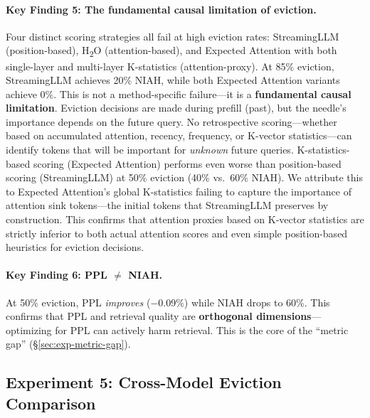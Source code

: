 \paragraph{Key Finding 5: The fundamental causal limitation of eviction.}
Four distinct scoring strategies all fail at high eviction rates: StreamingLLM (position-based), H\textsubscript{2}O (attention-based), and Expected Attention with both single-layer and multi-layer K-statistics (attention-proxy). At 85\% eviction, StreamingLLM achieves 20\% NIAH, while both Expected Attention variants achieve 0\%. This is not a method-specific failure---it is a \textbf{fundamental causal limitation}. Eviction decisions are made during prefill (past), but the needle's importance depends on the future query. No retrospective scoring---whether based on accumulated attention, recency, frequency, or K-vector statistics---can identify tokens that will be important for \emph{unknown} future queries. K-statistics-based scoring (Expected Attention) performs even worse than position-based scoring (StreamingLLM) at 50\% eviction (40\% vs.\ 60\% NIAH). We attribute this to Expected Attention's global K-statistics failing to capture the importance of attention sink tokens---the initial tokens that StreamingLLM preserves by construction. This confirms that attention proxies based on K-vector statistics are strictly inferior to both actual attention scores and even simple position-based heuristics for eviction decisions.

\paragraph{Key Finding 6: PPL $\neq$ NIAH.}
At 50\% eviction, PPL \emph{improves} ($-$0.09\%) while NIAH drops to 60\%. This confirms that PPL and retrieval quality are \textbf{orthogonal dimensions}---optimizing for PPL can actively harm retrieval. This is the core of the ``metric gap'' (\S\ref{sec:exp-metric-gap}).

\subsection{Experiment 5: Cross-Model Eviction Comparison}
\label{sec:exp-cross-model}

